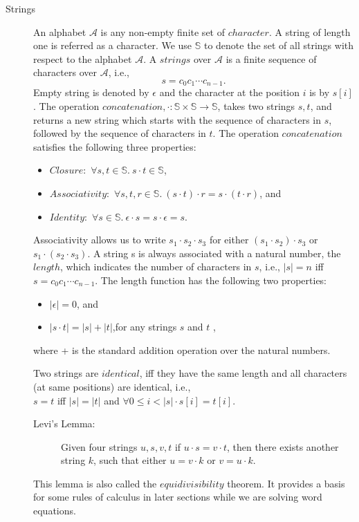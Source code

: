\begin{description}
	\item[Strings] 
	An alphabet \(\mathcal A\) is any non-empty finite set of \(character\). A string of length one is referred as a character. We use  \(\mathbb S\)  to denote the  set of all strings with respect to the alphabet \(\mathcal A\). A \(string s\) over \(\mathcal A\) is a finite sequence of characters over \(\mathcal A\), i.e., 
	\[s = c_0 c_1 \dotsb c_{n-1}. \]
	Empty string is denoted by  \(\epsilon\) and the character at the position \(i\) is by \(s[i]\). 
	The operation \(concatenation, \cdot : \mathbb S \times \mathbb S \to \mathbb S\), takes two strings \(s, t\), and returns a new string which starts with the sequence of characters in \(s\), followed by the sequence of characters in \(t\). The  operation \(concatenation\) satisfies the following three properties:
	\begin{itemize}
		\item \(Closure:\) \( \forall s,t  \in \mathbb S. \ s\cdot t \in  \mathbb S\),
		\item \(Associativity:\) \( \forall s,t,r  \in \mathbb S. \ (s\cdot t)\cdot r = s\cdot (t\cdot r)\),   and
		\item \(Identity:\) \( \forall s  \in \mathbb S. \ \epsilon \cdot s = s \cdot \epsilon = s \).
	\end{itemize}
	Associativity allows us to write \(s_1 \cdot s_2 \cdot s_3 \) for either \((s_1 \cdot s_2) \cdot s_3 \) or \(s_1 \cdot (s_2 \cdot s_3) \). A string s is always associated with a natural number, the \(length\), which indicates the number of characters in \(s\), i.e., \( |s| = n \) iff \(s = c_0c_1 \cdots c_{ n-1}\). The length function has the following two properties: 
	\begin{itemize}
	    \item \( |\epsilon|  = 0\), and
	    \item \(  |s \cdot t| =  |s| + |t|  \),for any strings \(s\) and \(t\) ,
	\end{itemize} 
	where + is the standard addition operation over the natural numbers.
	
	
	Two strings are \(identical\), iff they have the same length and all characters (at
same positions) are identical, i.e., \\
           \(s = t \) iff  \(|s| = |t| \) and \( \forall 0 \le i < |s| \cdot s[i] = t[i]\).
           	
           	
           	\begin{description}
           		\item[Levi’s Lemma: ] Given four strings \(u, s, v, t\) if  \(u \cdot s = v \cdot t \), then there exists another string \(k\), such that either \( u = v \cdot k\) or \(v = u \cdot k\).
           	\end{description}
           	This lemma is also called the \(equidivisibility\) theorem. It provides a basis for some rules of calculus in later sections while we are solving word equations.
           	

\end{description}
